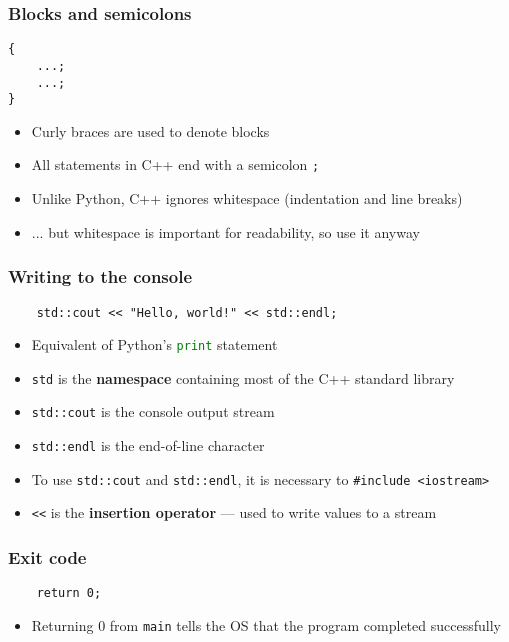 \begin{frame}[fragile]
	\frametitle{Blocks and semicolons}
	\begin{lstlisting}
{
    ...;
    ...;
}
	\end{lstlisting}
	\begin{itemize}
		\item Curly braces are used to denote blocks
		\item All statements in C++ end with a semicolon \lstinline{;}
		\item Unlike Python, C++ ignores whitespace (indentation and line breaks)
		\item ... but whitespace is important for readability, so use it anyway
	\end{itemize}
\end{frame}

\begin{frame}[fragile]
	\frametitle{Writing to the console}
	\begin{lstlisting}
    std::cout << "Hello, world!" << std::endl;
	\end{lstlisting}
	\begin{itemize}
		\item Equivalent of Python's \lstinline[language=Python]{print} statement
		\item \lstinline{std} is the \textbf{namespace} containing most of the C++ standard library
		\item \lstinline{std::cout} is the console output stream
		\item \lstinline{std::endl} is the end-of-line character
		\item To use \lstinline{std::cout} and \lstinline{std::endl}, it is necessary to
			\lstinline{#include <iostream>}
		\item \lstinline{<<} is the \textbf{insertion operator} --- used to write values to a stream
	\end{itemize}
\end{frame}

\begin{frame}[fragile]
	\frametitle{Exit code}
	\begin{lstlisting}
    return 0;
	\end{lstlisting}
	\begin{itemize}
		\item Returning 0 from \lstinline{main} tells the OS that the program completed successfully
	\end{itemize}
\end{frame}
